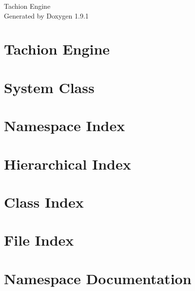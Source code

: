 \let\mypdfximage\pdfximage\def\pdfximage{\immediate\mypdfximage}\documentclass[twoside]{book}
\newcommand{\+}{\discretionary{\mbox{\scriptsize$\hookleftarrow$}}{}{}}
\newcommand{\clearemptydoublepage}{%
  \newpage{\pagestyle{empty}\cleardoublepage}%
}
\begin{document}
\raggedbottom

\hypersetup{pageanchor=false,
             bookmarksnumbered=true,
             pdfencoding=unicode
            }
\begin{titlepage}
\vspace*{7cm}
\begin{center}%
{\Large Tachion Engine }\\
\vspace*{1cm}
{\large Generated by Doxygen 1.9.1}\\
\end{center}
\end{titlepage}
\clearemptydoublepage
{}
\tableofcontents
\clearemptydoublepage
{}
\hypersetup{pageanchor=true}

\chapter{Tachion Engine}
\label{md__r_e_a_d_m_e}

\chapter{System Class}
\label{md_src__e_c_system__system_usage}

\chapter{Namespace Index}

\chapter{Hierarchical Index}

\chapter{Class Index}

\chapter{File Index}

\chapter{Namespace Documentation}


\end{document}
